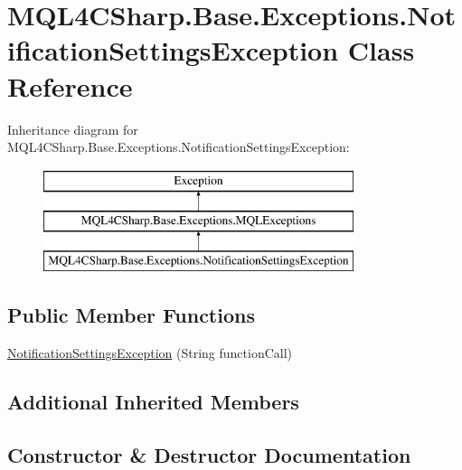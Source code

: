 \hypertarget{class_m_q_l4_c_sharp_1_1_base_1_1_exceptions_1_1_notification_settings_exception}{}\section{M\+Q\+L4\+C\+Sharp.\+Base.\+Exceptions.\+Notification\+Settings\+Exception Class Reference}
\label{class_m_q_l4_c_sharp_1_1_base_1_1_exceptions_1_1_notification_settings_exception}
Inheritance diagram for M\+Q\+L4\+C\+Sharp.\+Base.\+Exceptions.\+Notification\+Settings\+Exception\+:\begin{figure}[H]
\begin{center}
\leavevmode
\includegraphics[height=3.000000cm]{class_m_q_l4_c_sharp_1_1_base_1_1_exceptions_1_1_notification_settings_exception}
\end{center}
\end{figure}
\subsection*{Public Member Functions}
\begin{DoxyCompactItemize}
\item 
\hyperlink{class_m_q_l4_c_sharp_1_1_base_1_1_exceptions_1_1_notification_settings_exception_a94ffe7e9166608effb3dc1be01d28185}{Notification\+Settings\+Exception} (String function\+Call)
\end{DoxyCompactItemize}
\subsection*{Additional Inherited Members}


\subsection{Constructor \& Destructor Documentation}

